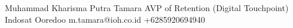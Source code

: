 %
%
%


\begin{referees}
		{Muhammad Kharisma Putra Tamara}
		{AVP of Retention (Digital Touchpoint)}
		{Indosat Ooredoo}
		{m.tamara@ioh.co.id}
		{+6285920694940}
	
\end{referees}
